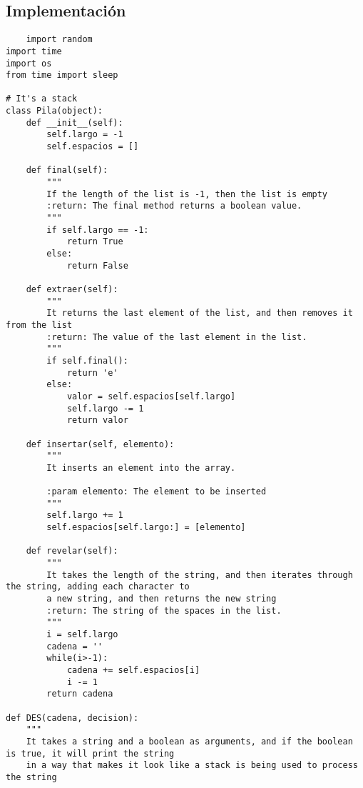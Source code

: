 \documentclass{article}
\begin{document}
\subsection{Implementaci\'on}
\begin{lstlisting}
    import random
import time
import os
from time import sleep

# It's a stack
class Pila(object):
    def __init__(self):
        self.largo = -1
        self.espacios = []

    def final(self):
        """
        If the length of the list is -1, then the list is empty
        :return: The final method returns a boolean value.
        """
        if self.largo == -1:
            return True
        else:
            return False

    def extraer(self):
        """
        It returns the last element of the list, and then removes it from the list
        :return: The value of the last element in the list.
        """
        if self.final():
            return 'e'
        else:
            valor = self.espacios[self.largo]
            self.largo -= 1
            return valor

    def insertar(self, elemento):
        """
        It inserts an element into the array.
        
        :param elemento: The element to be inserted
        """
        self.largo += 1
        self.espacios[self.largo:] = [elemento]

    def revelar(self):
        """
        It takes the length of the string, and then iterates through the string, adding each character to
        a new string, and then returns the new string
        :return: The string of the spaces in the list.
        """
        i = self.largo
        cadena = ''
        while(i>-1):
            cadena += self.espacios[i]
            i -= 1
        return cadena

def DES(cadena, decision):
    """
    It takes a string and a boolean as arguments, and if the boolean is true, it will print the string
    in a way that makes it look like a stack is being used to process the string
    

\end{lstlisting}
\end{document}
